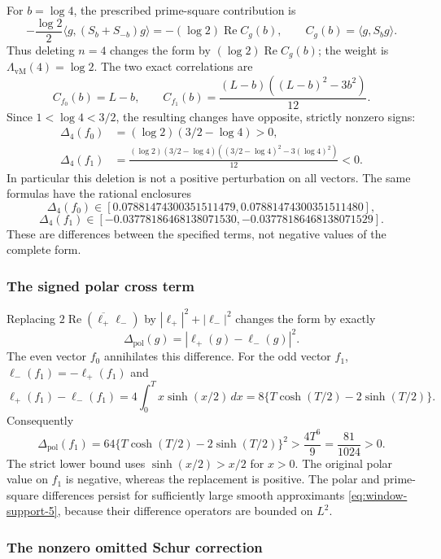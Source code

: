 For $b=\log4$, the prescribed prime-square contribution is
\[
 -\frac{\log2}{2}\langle g,(S_b+S_{-b})g\rangle
 =-(\log2)\operatorname{Re} C_g(b),\qquad C_g(b)=\langle g,S_bg\rangle.
\]
Thus deleting $n=4$ changes the form by
$(\log2)\operatorname{Re} C_g(b)$; the weight is $\Lambda_{\mathrm{vM}}(4)=\log2$.
The two exact correlations are
\[
 C_{f_0}(b)=L-b,
\qquad
 C_{f_1}(b)=\frac{(L-b)((L-b)^2-3b^2)}{12}.
\]
Since $1<\log4<3/2$, the resulting changes have opposite,
strictly nonzero signs:
\begin{align*}
 \Delta_4(f_0)&=(\log2)(3/2-\log4)>0,\\
 \Delta_4(f_1)&=
 \frac{(\log2)(3/2-\log4)
       ((3/2-\log4)^2-3(\log4)^2)}{12}<0.
\end{align*}
In particular this deletion is not a positive perturbation on
all vectors.  The same formulas have the rational enclosures
\[
 \Delta_4(f_0)\in[0.07881474300351511479,
                         0.07881474300351511480],
\]
\[
 \Delta_4(f_1)\in[-0.03778186468138071530,
                         -0.03778186468138071529].
\]
These are differences between the specified terms, not negative
values of the complete form.

\subsubsection{The signed polar cross term}

Replacing
$2\operatorname{Re}(\overline{\ell_+}\ell_-)$ by
$|\ell_+|^2+|\ell_-|^2$ changes the form by exactly
\[
 \Delta_{\mathrm{pol}}(g)=|\ell_+(g)-\ell_-(g)|^2.
\]
The even vector $f_0$ annihilates this difference.  For the odd
vector $f_1$, $\ell_-(f_1)=-\ell_+(f_1)$ and
\[
 \ell_+(f_1)-\ell_-(f_1)
 =4\int_0^T x\sinh(x/2)\,dx
 =8\{T\cosh(T/2)-2\sinh(T/2)\}.
\]
Consequently
\begin{equation}
 \Delta_{\mathrm{pol}}(f_1)
 =64\{T\cosh(T/2)-2\sinh(T/2)\}^2
 >\frac{4T^6}{9}=\frac{81}{1024}>0.
 \label{eq:window-support-8}
\end{equation}
The strict lower bound uses $\sinh(x/2)>x/2$ for $x>0$.
The original polar value on $f_1$ is negative, whereas the
replacement is positive.  The polar and prime-square
differences persist for sufficiently large smooth
approximants \eqref{eq:window-support-5}, because their difference operators are
bounded on $L^2$.

\subsubsection{The nonzero omitted Schur correction}

